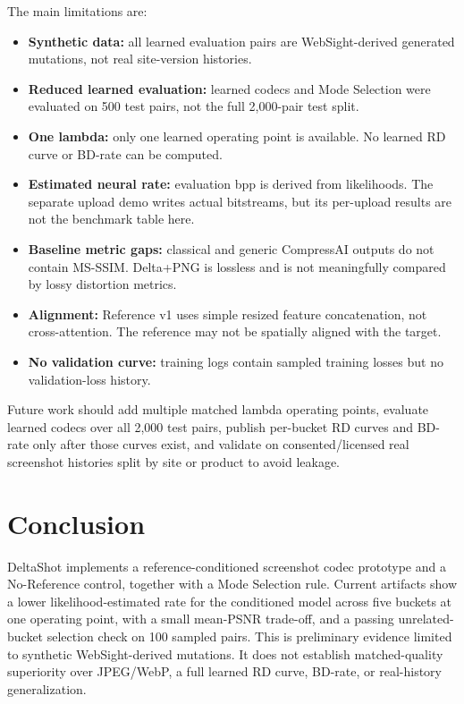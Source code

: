 \documentclass[conference]{IEEEtran}
\begin{document}
The main limitations are:
\begin{itemize}
\item \textbf{Synthetic data:} all learned evaluation pairs are WebSight-derived generated mutations, not real site-version histories.
\item \textbf{Reduced learned evaluation:} learned codecs and Mode Selection were evaluated on 500 test pairs, not the full 2,000-pair test split.
\item \textbf{One lambda:} only one learned operating point is available. No learned RD curve or BD-rate can be computed.
\item \textbf{Estimated neural rate:} evaluation bpp is derived from likelihoods. The separate upload demo writes actual bitstreams, but its per-upload results are not the benchmark table here.
\item \textbf{Baseline metric gaps:} classical and generic CompressAI outputs do not contain MS-SSIM. Delta+PNG is lossless and is not meaningfully compared by lossy distortion metrics.
\item \textbf{Alignment:} Reference v1 uses simple resized feature concatenation, not cross-attention. The reference may not be spatially aligned with the target.
\item \textbf{No validation curve:} training logs contain sampled training losses but no validation-loss history.
\end{itemize}

Future work should add multiple matched lambda operating points, evaluate learned codecs over all 2,000 test pairs, publish per-bucket RD curves and BD-rate only after those curves exist, and validate on consented/licensed real screenshot histories split by site or product to avoid leakage.

\section{Conclusion}
DeltaShot implements a reference-conditioned screenshot codec prototype and a No-Reference control, together with a Mode Selection rule. Current artifacts show a lower likelihood-estimated rate for the conditioned model across five buckets at one operating point, with a small mean-PSNR trade-off, and a passing unrelated-bucket selection check on 100 sampled pairs. This is preliminary evidence limited to synthetic WebSight-derived mutations. It does not establish matched-quality superiority over JPEG/WebP, a full learned RD curve, BD-rate, or real-history generalization.
\end{document}
